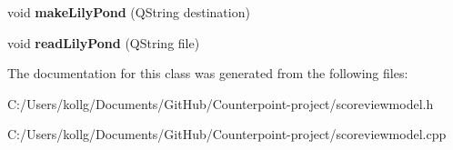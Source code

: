 \begin{DoxyCompactItemize}
\item 
\hypertarget{class_score_view_model_a99a64a7bd6e22a14eaf2920c44b1ca4a}{}void {\bfseries make\+Lily\+Pond} (Q\+String destination)\label{class_score_view_model_a99a64a7bd6e22a14eaf2920c44b1ca4a}

\item 
\hypertarget{class_score_view_model_a2ddc643ffec7b39df6e6b5fab7ab9e66}{}void {\bfseries read\+Lily\+Pond} (Q\+String file)\label{class_score_view_model_a2ddc643ffec7b39df6e6b5fab7ab9e66}

\end{DoxyCompactItemize}


The documentation for this class was generated from the following files\+:\begin{DoxyCompactItemize}
\item 
C\+:/\+Users/kollg/\+Documents/\+Git\+Hub/\+Counterpoint-\/project/scoreviewmodel.\+h\item 
C\+:/\+Users/kollg/\+Documents/\+Git\+Hub/\+Counterpoint-\/project/scoreviewmodel.\+cpp\end{DoxyCompactItemize}
